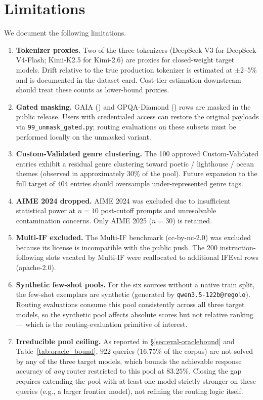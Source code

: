 \documentclass[11pt,a4paper]{article}
\begin{document}
\section{Limitations}\label{sec:limitations}

We document the following limitations.

\begin{enumerate}[leftmargin=*,itemsep=2pt]
  \item \textbf{Tokenizer proxies.} Two of the three tokenizers (DeepSeek-V3 for DeepSeek-V4-Flash; Kimi-K2.5 for Kimi-2.6) are proxies for closed-weight target models. Drift relative to the true production tokenizer is estimated at $\pm$2--5\% and is documented in the dataset card. Cost-tier estimation downstream should treat these counts as lower-bound proxies.
  \item \textbf{Gated masking.} GAIA (\cite{mialon2023gaia}) and GPQA-Diamond (\cite{rein2024gpqa}) rows are masked in the public release. Users with credentialed access can restore the original payloads via \texttt{99\_unmask\_gated.py}; routing evaluations on these subsets must be performed locally on the unmasked variant.
  \item \textbf{Custom-Validated genre clustering.} The 100 approved Custom-Validated entries exhibit a residual genre clustering toward poetic / lighthouse / ocean themes (observed in approximately 30\% of the pool). Future expansion to the full target of 404 entries should oversample under-represented genre tags.
  \item \textbf{AIME 2024 dropped.} AIME 2024 was excluded due to insufficient statistical power at $n{=}10$ post-cutoff prompts and unresolvable contamination concerns. Only AIME 2025 ($n{=}30$) is retained.
  \item \textbf{Multi-IF excluded.} The Multi-IF benchmark (cc-by-nc-2.0) was excluded because its license is incompatible with the public push. The 200 instruction-following slots vacated by Multi-IF were reallocated to additional IFEval rows (apache-2.0).
  \item \textbf{Synthetic few-shot pools.} For the six sources without a native train split, the few-shot exemplars are synthetic (generated by \texttt{qwen3.5-122b@regolo}). Routing evaluations consume this pool consistently across all three target models, so the synthetic pool affects absolute scores but not relative ranking — which is the routing-evaluation primitive of interest.
  \item \textbf{Irreducible pool ceiling.} As reported in \S\ref{sec:eval-oraclebound} and Table~\ref{tab:oracle_bound}, $922$ queries ($16.75\%$ of the corpus) are not solved by any of the three target models, which bounds the achievable response accuracy of \emph{any} router restricted to this pool at $83.25\%$. Closing the gap requires extending the pool with at least one model strictly stronger on these queries (e.g., a larger frontier model), not refining the routing logic itself.
\end{enumerate}
\end{document}
